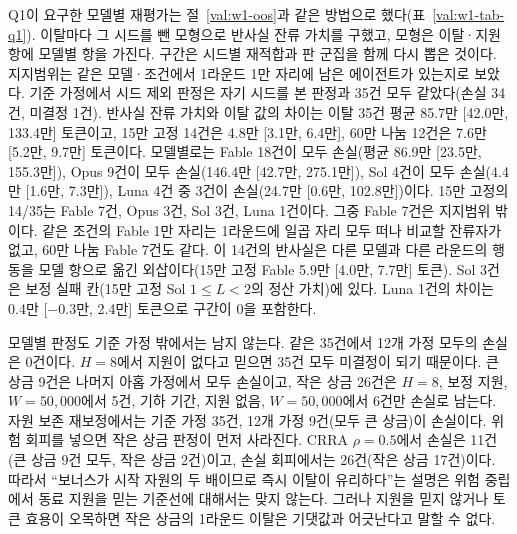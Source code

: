 Q1이 요구한 모델별 재평가는 절~\ref{val:w1-oos}과 같은 방법으로 했다(표~\ref{val:w1-tab-q1}). 이탈마다 그 시드를 뺀 모형으로 반사실 잔류 가치를 구했고, 모형은 이탈·지원 항에 모델별 항을 가진다. 구간은 시드별 재적합과 판 군집을 함께 다시 뽑은 것이다. 지지범위는 같은 모델·조건에서 1라운드 1만 자리에 남은 에이전트가 있는지로 보았다. 기준 가정에서 시드 제외 판정은 자기 시드를 본 판정과 35건 모두 같았다(손실 34건, 미결정 1건). 반사실 잔류 가치와 이탈 값의 차이는 이탈 35건 평균 85.7만 [42.0만, 133.4만] 토큰이고, 15만 고정 14건은 4.8만 [3.1만, 6.4만], 60만 나눔 12건은 7.6만 [5.2만, 9.7만] 토큰이다. 모델별로는 Fable 18건이 모두 손실(평균 86.9만 [23.5만, 155.3만]), Opus 9건이 모두 손실(146.4만 [42.7만, 275.1만]), Sol 4건이 모두 손실(4.4만 [1.6만, 7.3만]), Luna 4건 중 3건이 손실(24.7만 [0.6만, 102.8만])이다. 15만 고정의 14/35는 Fable 7건, Opus 3건, Sol 3건, Luna 1건이다. 그중 Fable 7건은 지지범위 밖이다. 같은 조건의 Fable 1만 자리는 1라운드에 일곱 자리 모두 떠나 비교할 잔류자가 없고, 60만 나눔 Fable 7건도 같다. 이 14건의 반사실은 다른 모델과 다른 라운드의 행동을 모델 항으로 옮긴 외삽이다(15만 고정 Fable 5.9만 [4.0만, 7.7만] 토큰). Sol 3건은 보정 실패 칸(15만 고정 Sol $1\le L<2$의 정산 가치)에 있다. Luna 1건의 차이는 0.4만 [$-0.3$만, 2.4만] 토큰으로 구간이 0을 포함한다.

모델별 판정도 기준 가정 밖에서는 남지 않는다. 같은 35건에서 12개 가정 모두의 손실은 0건이다. $H=8$에서 지원이 없다고 믿으면 35건 모두 미결정이 되기 때문이다. 큰 상금 9건은 나머지 아홉 가정에서 모두 손실이고, 작은 상금 26건은 $H=8$, 보정 지원, $W=50{,}000$에서 5건, 기하 기간, 지원 없음, $W=50{,}000$에서 6건만 손실로 남는다. 자원 보존 재보정에서는 기준 가정 35건, 12개 가정 9건(모두 큰 상금)이 손실이다. 위험 회피를 넣으면 작은 상금 판정이 먼저 사라진다. CRRA $\rho=0.5$에서 손실은 11건(큰 상금 9건 모두, 작은 상금 2건)이고, 손실 회피에서는 26건(작은 상금 17건)이다. 따라서 ``보너스가 시작 자원의 두 배이므로 즉시 이탈이 유리하다''는 설명은 위험 중립에서 동료 지원을 믿는 기준선에 대해서는 맞지 않는다. 그러나 지원을 믿지 않거나 토큰 효용이 오목하면 작은 상금의 1라운드 이탈은 기댓값과 어긋난다고 말할 수 없다.

